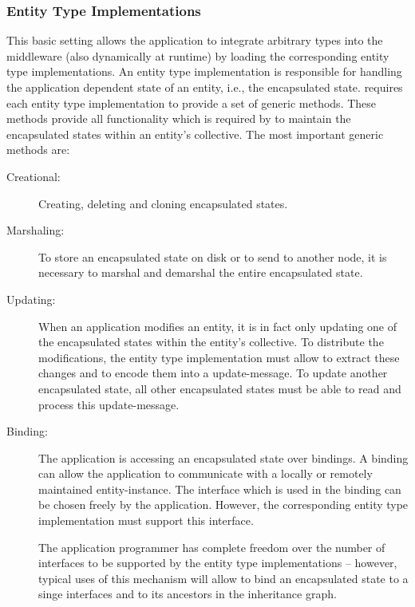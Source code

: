 \documentclass[a4paper, 10pt]{book}
\begin{document}
                \subsubsection{Entity Type Implementations}
                \label{sec:entity-type-impl}
                This basic setting allows the application to integrate arbitrary types
                into the middleware (also dynamically at runtime) by loading the
                corresponding entity type implementations. 
                An entity type implementation is responsible for handling the
                application dependent state of an entity, i.e., the encapsulated
                state.
                \SYNEIGHT requires each entity type implementation to provide a set of
                generic methods. These methods provide all functionality which is
                required by \SYNEIGHT to maintain the encapsulated states within an
                entity's collective. The most important generic methods are:
                \begin{description}
                    \item[Creational:] Creating, deleting and cloning encapsulated
                        states. 
                    \item[Marshaling:] To store an encapsulated state on disk or to send
                        to another node, it is necessary to marshal and demarshal the entire
                        encapsulated state.
                    \item[Updating:] When an application modifies an entity, it is in fact
                        only updating one of the encapsulated states within the entity's
                        collective. To distribute the modifications, the entity type
                        implementation must allow to extract these changes and to encode
                        them into a update-message. To update another encapsulated state,
                        all other encapsulated states must be able to read and process this
                        update-message.
                    \item[Binding:] The application is accessing an encapsulated state
                        over bindings. A binding can allow the application to communicate
                        with a locally or remotely maintained entity-instance. The interface
                        which is used in the binding can be chosen freely by the
                        application. However, the corresponding entity type implementation
                        must support this interface.

                        The application programmer has complete freedom over the number of
                        interfaces to be supported by the entity type implementations --
                        however, typical uses of this mechanism will allow to bind an
                        encapsulated state to a singe interfaces and to its ancestors in the
                        inheritance graph. 
                \end{description}
\end{document}
